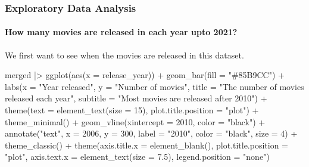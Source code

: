 \documentclass[
]{article}
\newenvironment{Shaded}{\begin{snugshade}}{\end{snugshade}}
\newcommand{\AttributeTok}[1]{\textcolor[rgb]{0.77,0.63,0.00}{#1}}
\newcommand{\DecValTok}[1]{\textcolor[rgb]{0.00,0.00,0.81}{#1}}
\newcommand{\FloatTok}[1]{\textcolor[rgb]{0.00,0.00,0.81}{#1}}
\newcommand{\FunctionTok}[1]{\textcolor[rgb]{0.00,0.00,0.00}{#1}}
\newcommand{\NormalTok}[1]{#1}
\newcommand{\SpecialCharTok}[1]{\textcolor[rgb]{0.00,0.00,0.00}{#1}}
\newcommand{\StringTok}[1]{\textcolor[rgb]{0.31,0.60,0.02}{#1}}
\begin{document}
\hypertarget{exploratory-data-analysis}{%
\subsubsection{Exploratory Data
Analysis}\label{exploratory-data-analysis}}

\hypertarget{how-many-movies-are-released-in-each-year-upto-2021}{%
\paragraph{How many movies are released in each year upto
2021?}\label{how-many-movies-are-released-in-each-year-upto-2021}}

We first want to see when the movies are released in this dataset.

\begin{Shaded}
\begin{Highlighting}[]
\NormalTok{merged }\SpecialCharTok{|\textgreater{}}
  \FunctionTok{ggplot}\NormalTok{(}\FunctionTok{aes}\NormalTok{(}\AttributeTok{x =}\NormalTok{ release\_year)) }\SpecialCharTok{+}
  \FunctionTok{geom\_bar}\NormalTok{(}\AttributeTok{fill =} \StringTok{"\#85B9CC"}\NormalTok{) }\SpecialCharTok{+}
  \FunctionTok{labs}\NormalTok{(}\AttributeTok{x =} \StringTok{"Year released"}\NormalTok{,}
       \AttributeTok{y =} \StringTok{"Number of movies"}\NormalTok{,}
       \AttributeTok{title =} \StringTok{"The number of movies released each year"}\NormalTok{,}
       \AttributeTok{subtitle =} \StringTok{"Most movies are released after 2010"}\NormalTok{) }\SpecialCharTok{+}
  \FunctionTok{theme}\NormalTok{(}\AttributeTok{text =} \FunctionTok{element\_text}\NormalTok{(}\AttributeTok{size =} \DecValTok{15}\NormalTok{),}
        \AttributeTok{plot.title.position =} \StringTok{"plot"}\NormalTok{) }\SpecialCharTok{+}
  \FunctionTok{theme\_minimal}\NormalTok{() }\SpecialCharTok{+}
  \FunctionTok{geom\_vline}\NormalTok{(}\AttributeTok{xintercept =} \DecValTok{2010}\NormalTok{, }\AttributeTok{color =} \StringTok{"black"}\NormalTok{) }\SpecialCharTok{+}
  \FunctionTok{annotate}\NormalTok{(}\StringTok{"text"}\NormalTok{, }\AttributeTok{x =} \DecValTok{2006}\NormalTok{, }\AttributeTok{y =} \DecValTok{300}\NormalTok{, }\AttributeTok{label =} \StringTok{"2010"}\NormalTok{, }\AttributeTok{color =} \StringTok{"black"}\NormalTok{, }\AttributeTok{size =} \DecValTok{4}\NormalTok{) }\SpecialCharTok{+}
  \FunctionTok{theme\_classic}\NormalTok{() }\SpecialCharTok{+}
  \FunctionTok{theme}\NormalTok{(}\AttributeTok{axis.title.x =} \FunctionTok{element\_blank}\NormalTok{(),}
        \AttributeTok{plot.title.position =} \StringTok{"plot"}\NormalTok{,}
        \AttributeTok{axis.text.x =} \FunctionTok{element\_text}\NormalTok{(}\AttributeTok{size =} \FloatTok{7.5}\NormalTok{),}
        \AttributeTok{legend.position =} \StringTok{"none"}\NormalTok{)}
\end{Highlighting}
\end{Shaded}
\end{document}

